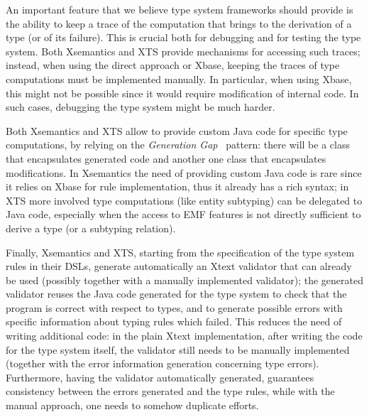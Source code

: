 An important feature that we believe type system frameworks should provide is
the ability to keep a trace of the computation that brings to the derivation of
a type (or of its failure).  This is crucial both for debugging and for testing
the type system.  Both Xsemantics and XTS provide mechanisms for accessing such
traces; instead, when using the direct approach or Xbase, keeping the traces of
type computations must be implemented manually.  In particular, when using
Xbase, this might not be possible since it would require modification of
internal code.  In such cases, debugging the type system might be much harder.

Both Xsemantics and XTS allow to provide custom Java code for specific type
computations, by relying on the \emph{Generation Gap}~\cite{Vlissides:1996:GGS}
pattern: there will be a class that encapsulates generated code and another one
class that encapsulates modifications.  In Xsemantics the need of providing
custom Java code is rare since it relies on Xbase for rule implementation, thus
it already has a rich syntax; in XTS more involved type computations (like
entity subtyping) can be delegated to Java code, especially when the access to
EMF features is not directly sufficient to derive a type (or a subtyping
relation).

Finally, Xsemantics and XTS, starting from the specification of the type system
rules in their DSLs, generate automatically an Xtext validator that can already
be used (possibly together with a manually implemented validator); the generated
validator reuses the Java code generated for the type system to check that the
program is correct with respect to types, and to generate possible errors with
specific information about typing rules which failed.
This reduces the need of writing additional code: in the plain Xtext
implementation, after writing the code for the type system itself, the validator
still needs to be manually implemented (together with the error information
generation concerning type errors).  Furthermore, having the validator
automatically generated, guarantees consistency between the errors generated and
the type rules, while with the manual approach, one needs to somehow duplicate
efforts.
